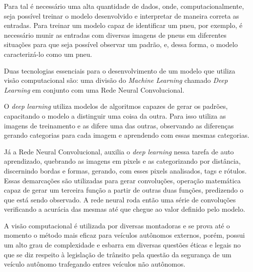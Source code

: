 Para tal é necessário uma alta quantidade de dados, onde, computacionalmente,
seja possível treinar o modelo desenvolvido e interpretar de maneira correta as
entradas. Para treinar um modelo capaz de identificar um pneu, por exemplo, é
necessário munir as entradas com diversas imagens de pneus em diferentes
situações para que seja possível observar um padrão, e, dessa forma, o modelo
caracterizá-lo como um pneu.

Duas tecnologias essenciais para o desenvolvimento de um modelo que utiliza
visão computacional são: uma divisão do \textit{Machine Learning} chamado
\textit{Deep Learning} em conjunto com uma Rede Neural Convolucional.

O \textit{deep learning} utiliza modelos de algoritmos capazes de gerar os
padrões, capacitando o modelo a distinguir uma coisa da outra. Para isso
utiliza as imagens de treinamento e as difere uma das outras, observando as
diferenças gerando categorias para cada imagem e aprendendo com essas mesmas
categorias.

Já a Rede Neural Convolucional, auxilia o \textit{deep learning} nessa tarefa
de auto aprendizado, quebrando as imagens em pixels e as categorizando por
distância, discernindo bordas e formas, gerando, com esses pixels analisados,
tags e rótulos. Essas demarcações são utilizadas para gerar convoluções,
operação matemática capaz de gerar um terceira função a partir de outras duas
funções, predizendo o que está sendo observado. A rede neural roda então uma
série de convoluções verificando a acurácia das mesmas até que chegue ao valor
definido pelo modelo.

A visão computacional é utilizada por diversas montadoras e se prova até o
momento o método mais eficaz para veículos autônomos externos, porém, possui um
alto grau de complexidade e esbarra em diversas questões éticas e legais no que
se diz respeito à legislação de trânsito pela questão da segurança de um
veículo autônomo trafegando entres veículos não autônomos.

